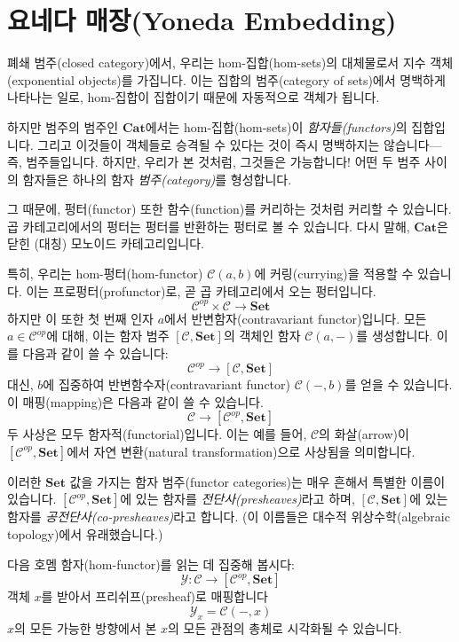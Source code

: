 \documentclass[DaoFP]{subfiles}
\begin{document}
\section{요네다 매장(Yoneda Embedding)}

폐쇄 범주(closed category)에서, 우리는 hom-집합(hom-sets)의 대체물로서 지수 객체(exponential objects)를 가집니다. 이는 집합의 범주(category of sets)에서 명백하게 나타나는 일로, hom-집합이 집합이기 때문에 자동적으로 객체가 됩니다.

하지만 범주의 범주인 $\mathbf{Cat}$에서는 hom-집합(hom-sets)이 \emph{함자들(functors)}의 집합입니다. 그리고 이것들이 객체들로 승격될 수 있다는 것이 즉시 명백하지는 않습니다---즉, 범주들입니다. 하지만, 우리가 본 것처럼, 그것들은 가능합니다! 어떤 두 범주 사이의 함자들은 하나의 함자 \emph{범주(category)}를 형성합니다.

그 때문에, 펑터(functor) 또한 함수(function)를 커리하는 것처럼 커리할 수 있습니다. 곱 카테고리에서의 펑터는 펑터를 반환하는 펑터로 볼 수 있습니다. 다시 말해, $\mathbf{Cat}$은 닫힌 (대칭) 모노이드 카테고리입니다.

특히, 우리는 hom-펑터(hom-functor) $\mathcal{C}(a, b)$에 커링(currying)을 적용할 수 있습니다. 이는 프로펑터(profunctor)로, 곧 곱 카테고리에서 오는 펑터입니다.
\[ \mathcal{C}^{op} \times \mathcal{C} \to  \mathbf{Set} \]
하지만 이 또한 첫 번째 인자 $a$에서 반변함자(contravariant functor)입니다. 모든 $a \in \mathcal{C}^{op}$에 대해, 이는 함자 범주 $ [\mathcal{C},  \mathbf{Set}] $의 객체인 함자 $\mathcal{C}(a, -)$를 생성합니다. 이를 다음과 같이 쓸 수 있습니다:
\[ \mathcal{C}^{op} \to [\mathcal{C},  \mathbf{Set}] \]
대신, $b$에 집중하여 반변함수자(contravariant functor) $\mathcal{C}(-, b)$를 얻을 수 있습니다. 이 매핑(mapping)은 다음과 같이 쓸 수 있습니다.
\[ \mathcal{C} \to [\mathcal{C}^{op},  \mathbf{Set}] \]
두 사상은 모두 함자적(functorial)입니다. 이는 예를 들어, $\mathcal{C}$의 화살(arrow)이 $[\mathcal{C}^{op}, \mathbf{Set}]$에서 자연 변환(natural transformation)으로 사상됨을 의미합니다.

이러한 $\mathbf{Set}$ 값을 가지는 함자 범주(functor categories)는 매우 흔해서 특별한 이름이 있습니다. $[\mathcal{C}^{op},  \mathbf{Set}]$에 있는 함자를 \emph{전단사(presheaves)}라고 하며, $[\mathcal{C},  \mathbf{Set}]$에 있는 함자를 \emph{공전단사(co-presheaves)}라고 합니다. (이 이름들은 대수적 위상수학(algebraic topology)에서 유래했습니다.)

다음 호멤 함자(hom-functor)를 읽는 데 집중해 봅시다:
\[ \mathcal{Y} \colon \mathcal{C} \to [\mathcal{C}^{op},  \mathbf{Set}] \]
객체 $x$를 받아서 프리쉬프(presheaf)로 매핑합니다
\[ \mathcal Y_x = \mathcal{C}(-, x) \]
$x$의 모든 가능한 방향에서 본 $x$의 모든 관점의 총체로 시각화될 수 있습니다.
\end{document}
